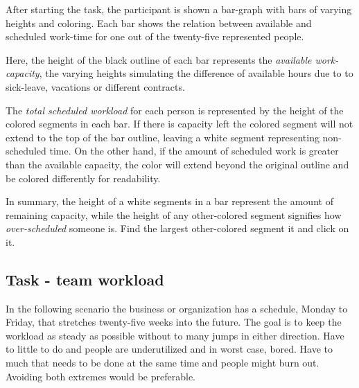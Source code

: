 \documentclass[nofilelist,dvipsnames]{cslthse-msc}
\begin{document}
{        After starting the task, the participant is shown a bar-graph with bars
        of varying heights and coloring. Each bar shows the relation between
        available and scheduled work-time for one out of the twenty-five
        represented people.

        Here, the height of the black outline of each bar represents the
        \textit{available work-capacity}, the varying heights simulating the
        difference of available hours due to to sick-leave, vacations or
        different contracts.

        The \textit{total scheduled workload} for
        each person is represented by the height of the colored segments in
        each bar. If there is capacity left the colored segment will not extend to the
        top of the bar outline, leaving a white segment representing
        non-scheduled time. On the other hand, if the amount of scheduled work
        is greater than the available capacity, the color will extend beyond
        the original outline and be colored differently for readability.

        In summary, the height of a white segments in a bar represent the
        amount of remaining capacity, while the height of any other-colored
        segment signifies how \textit{over-scheduled} someone is. Find the
        largest other-colored segment it and click on it.

      \subsection{Task - team workload}

        \textit{\ideaTwo}

        In the following scenario the business or organization has a schedule,
        Monday to Friday, that stretches twenty-five weeks into the future. The
        goal is to keep the workload as steady as possible without to many
        jumps in either direction. Have to little to do and people are
        underutilized and in worst case, bored. Have to much that needs to be
        done at the same time and people might burn out. Avoiding both
        extremes would be preferable.

}
\end{document}

